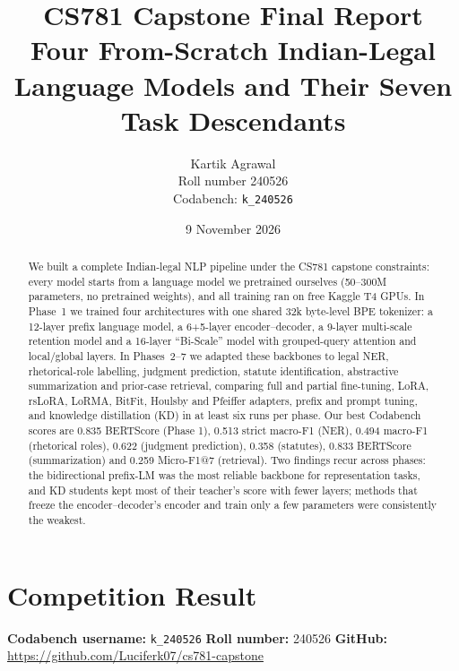 \documentclass[11pt]{article}
\title{\textbf{CS781 Capstone Final Report}\\[3pt]
\large Four From-Scratch Indian-Legal Language Models and Their Seven Task Descendants}
\author{Kartik Agrawal \\ Roll number 240526 \\ Codabench: \texttt{k\_240526}}
\date{9 November 2026}
\begin{document}
\maketitle

\begin{abstract}
We built a complete Indian-legal NLP pipeline under the CS781 capstone constraints: every model starts from a language model we pretrained ourselves (50--300M parameters, no pretrained weights), and all training ran on free Kaggle T4 GPUs. In Phase~1 we trained four architectures with one shared 32k byte-level BPE tokenizer: a 12-layer prefix language model, a 6+5-layer encoder--decoder, a 9-layer multi-scale retention model and a 16-layer ``Bi-Scale'' model with grouped-query attention and local/global layers. In Phases~2--7 we adapted these backbones to legal NER, rhetorical-role labelling, judgment prediction, statute identification, abstractive summarization and prior-case retrieval, comparing full and partial fine-tuning, LoRA, rsLoRA, LoRMA, BitFit, Houlsby and Pfeiffer adapters, prefix and prompt tuning, and knowledge distillation (KD) in at least six runs per phase. Our best Codabench scores are 0.835 BERTScore (Phase 1), 0.513 strict macro-F1 (NER), 0.494 macro-F1 (rhetorical roles), 0.622 (judgment prediction), 0.358 (statutes), 0.833 BERTScore (summarization) and 0.259 Micro-F1@7 (retrieval). Two findings recur across phases: the bidirectional prefix-LM was the most reliable backbone for representation tasks, and KD students kept most of their teacher's score with fewer layers; methods that freeze the encoder--decoder's encoder and train only a few parameters were consistently the weakest.
\end{abstract}

\section{Competition Result}
\label{sec:competition}
\textbf{Codabench username:} \texttt{k\_240526} \quad \textbf{Roll number:} 240526 \quad
\textbf{GitHub:} \url{https://github.com/Luciferk07/cs781-capstone}
\end{document}
